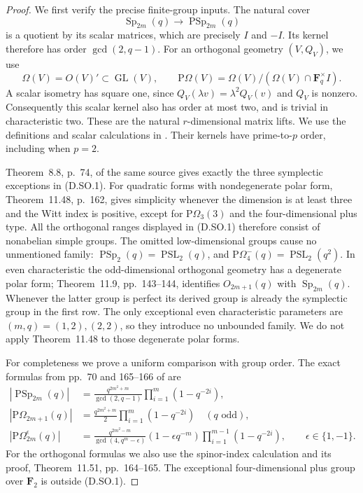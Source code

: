 \begin{proof}
We first verify the precise finite-group inputs. The natural cover
\[
 \operatorname{Sp}_{2m}(q)\longrightarrow
                      \operatorname{PSp}_{2m}(q)
\]
is a quotient by its scalar matrices, which are precisely $I$ and
$-I$. Its kernel therefore has order $\gcd(2,q-1)$.
For an orthogonal geometry $(V,Q_V)$, we use
\[
 \Omega(V)=O(V)'\subset\operatorname{GL}(V),\qquad
 \mathrm{P}\Omega(V)
     =\Omega(V)/(\Omega(V)\cap\mathbf F_q^\times I).
\]
A scalar isometry has square one, since
$Q_V(\lambda v)=\lambda^2Q_V(v)$ and $Q_V$ is nonzero.
Consequently this scalar kernel also has order at most two,
and is trivial in characteristic two. These are the natural
$r$-dimensional matrix lifts. We use the definitions and scalar
calculations in \citet[pp.~69 and 136--137]{Taylor1992ClassicalB}.
Their kernels have prime-to-$p$ order, including when $p=2$.

Theorem~8.8, p.~74, of the same source gives exactly the three
symplectic exceptions in (D.SO.1). For quadratic forms with
nondegenerate polar form, Theorem~11.48, p.~162, gives simplicity
whenever the dimension is at least three and the Witt index is
positive, except for $\mathrm{P}\Omega_3(3)$ and the
four-dimensional plus type. All the orthogonal ranges displayed
in (D.SO.1) therefore consist of nonabelian simple groups.
The omitted low-dimensional groups cause no unmentioned family:
$\operatorname{PSp}_2(q)=\operatorname{PSL}_2(q)$, and
$\mathrm{P}\Omega^{-}_4(q)=\operatorname{PSL}_2(q^2)$.
In even characteristic the odd-dimensional orthogonal geometry
has a degenerate polar form; Theorem~11.9, pp.~143--144, identifies
$O_{2m+1}(q)$ with $\operatorname{Sp}_{2m}(q)$.
Whenever the latter group is perfect its derived group is already
the symplectic group in the first row. The only exceptional even
characteristic parameters are $(m,q)=(1,2),(2,2)$, so they introduce
no unbounded family. We do not apply Theorem~11.48 to those
degenerate polar forms.

For completeness we prove a uniform comparison with group order.
The exact formulas from pp.~70 and 165--166 of
\citet{Taylor1992ClassicalB} are
\[
\begin{split}
 |\operatorname{PSp}_{2m}(q)|
  &=\frac{q^{2m^2+m}}{\gcd(2,q-1)}
                   \prod_{i=1}^{m}(1-q^{-2i}),\\
 |\mathrm{P}\Omega_{2m+1}(q)|
  &=\frac{q^{2m^2+m}}2
                   \prod_{i=1}^{m}(1-q^{-2i})\quad(q\text{ odd}),\\
 |\mathrm{P}\Omega^{\epsilon}_{2m}(q)|
  &=\frac{q^{2m^2-m}}{\gcd(4,q^m-\epsilon)}
       (1-\epsilon q^{-m})
                   \prod_{i=1}^{m-1}(1-q^{-2i}),
       \qquad\epsilon\in\{1,-1\}.
\end{split}                                                   \tag{D.SO.3}
\]
For the orthogonal formulas we also use the spinor-index
calculation and its proof, Theorem~11.51, pp.~164--165.
The exceptional four-dimensional plus group over $\mathbf F_2$
is outside (D.SO.1).


\end{proof}
